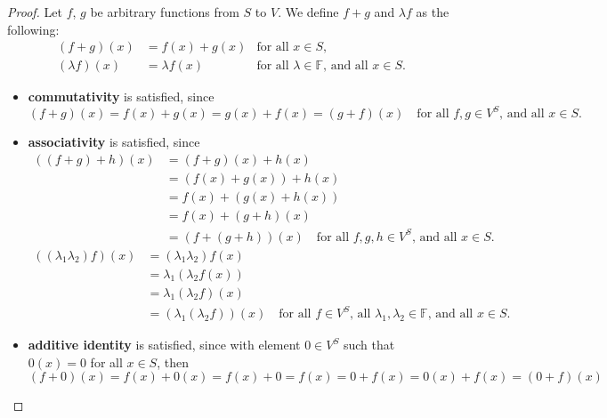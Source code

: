 \begin{proof}
    Let $f$, $g$ be arbitrary functions from $S$ to $V$. We define $f + g$ and $\lambda f$ as the following:
    \begin{align*}
        (f + g)(x)     & = f(x) + g(x)  & \text{for all $x\in S$},                                 \\
        (\lambda f)(x) & = \lambda f(x) & \text{for all $\lambda\in\mathbb{F}$, and all $x\in S$}.
    \end{align*}

    \begin{itemize}
        \item \textbf{commutativity} is satisfied, since
              \[
                  (f + g)(x) = f(x) + g(x) = g(x) + f(x) = (g + f)(x) \quad\text{for all $f, g\in V^{S}$, and all $x\in S$}.
              \]
        \item \textbf{associativity} is satisfied, since
              \begin{align*}
                  ((f + g) + h)(x) & = (f + g)(x) + h(x)                                                           \\
                                   & = (f(x) + g(x)) + h(x)                                                        \\
                                   & = f(x) + (g(x) + h(x))                                                        \\
                                   & = f(x) + (g + h)(x)                                                           \\
                                   & = (f + (g + h))(x) \quad \text{for all $f, g, h\in V^{S}$, and all $x\in S$.}
              \end{align*}
              \begin{align*}
                  ((\lambda_{1}\lambda_{2})f)(x) & = (\lambda_{1}\lambda_{2})f(x)                                                                                                      \\
                                                 & = \lambda_{1}(\lambda_{2}f(x))                                                                                                      \\
                                                 & = \lambda_{1}(\lambda_{2}f)(x)                                                                                                      \\
                                                 & = (\lambda_{1}(\lambda_{2}f))(x) \quad \text{for all $f\in V^{S}$, all $\lambda_{1}, \lambda_{2}\in \mathbb{F}$, and all $x\in S$.}
              \end{align*}
        \item \textbf{additive identity} is satisfied, since with element $0\in V^{S}$ such that $0(x) = 0$ for all $x\in S$, then
              \[
                  (f + 0)(x) = f(x) + 0(x) = f(x) + 0 = f(x) = 0 + f(x) = 0(x) + f(x) = (0 + f)(x)
              \]


\end{itemize}
\end{proof}
